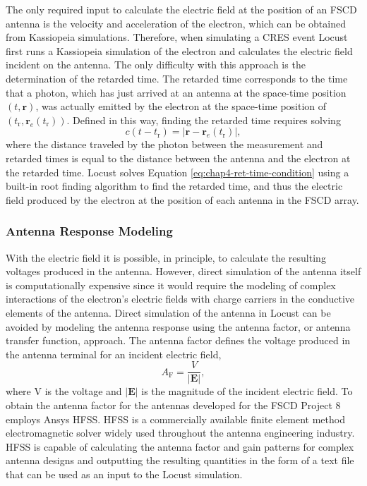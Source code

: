 The only required input to calculate the electric field at the position of an FSCD antenna is the velocity and acceleration of the electron, which can be obtained from Kassiopeia simulations. Therefore, when simulating a CRES event Locust first runs a Kassiopeia simulation of the electron and calculates the electric field incident on the antenna. The only difficulty with this approach is the determination of the retarded time. The retarded time corresponds to the time that a photon, which has just arrived at an antenna at the space-time position $(t,\bm{r})$, was actually emitted by the electron at the space-time position of $(t_\mathrm{r}, \bm{r}_e(t_\mathrm{r}))$. Defined in this way, finding the retarded time requires solving 
\begin{equation}
    c(t-t_\mathrm{r}) = |\bm{r}-\bm{r}_e(t_\mathrm{r})|,
    \label{eq:chap4-ret-time-condition}
\end{equation}
where the distance traveled by the photon between the measurement and retarded times is equal to the distance between the antenna and the electron at the retarded time. Locust solves Equation \ref{eq:chap4-ret-time-condition} using a built-in root finding algorithm to find the retarded time, and thus the electric field produced by the electron at the position of each antenna in the FSCD array.

\subsubsection*{Antenna Response Modeling}

With the electric field it is possible, in principle, to calculate the resulting voltages produced in the antenna. However, direct simulation of the antenna itself is computationally expensive since it would require the modeling of complex interactions of the electron's electric fields with charge carriers in the conductive elements of the antenna. Direct simulation of the antenna in Locust can be avoided by modeling the antenna response using the antenna factor, or antenna transfer function, approach. The antenna factor defines the voltage produced in the antenna terminal for an incident electric field,
\begin{equation}
    A_\mathrm{F}=\frac{V}{|\bm{E}|},
\end{equation}
where V is the voltage and $|\bm{E}|$ is the magnitude of the incident electric field. To obtain the antenna factor for the antennas developed for the FSCD Project 8 employs Ansys HFSS. HFSS is a commercially available finite element method electromagnetic solver widely used throughout the antenna engineering industry. HFSS is capable of calculating the antenna factor and gain patterns for complex antenna designs and outputting the resulting quantities in the form of a text file that can be used as an input to the Locust simulation. 

